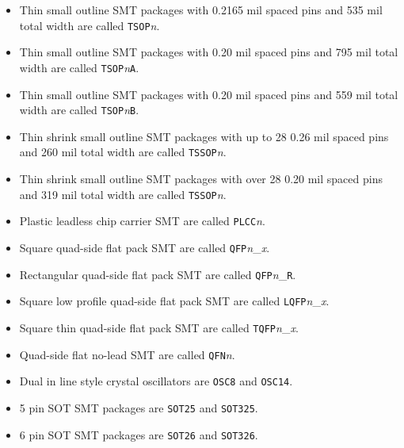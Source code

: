 \documentclass{article}
\begin{document}
\begin{itemize}
\item   Thin small outline SMT packages with 0.2165 mil spaced pins and
	535 mil total width are called {\tt TSOP}{\it n}.

\item   Thin small outline SMT packages with 0.20 mil spaced pins and
	795 mil total width are called {\tt TSOP}{\it n}{\tt A}.

\item   Thin small outline SMT packages with 0.20 mil spaced pins and
	559 mil total width are called {\tt TSOP}{\it n}{\tt B}.

\item   Thin shrink small outline SMT packages with up to 28 0.26 mil
	spaced pins and 260 mil total width are called {\tt TSSOP}{\it n}.

\item   Thin shrink small outline SMT packages with over 28 0.20 mil
	spaced pins and 319 mil total width are called {\tt TSSOP}{\it n}.

\item   Plastic leadless chip carrier SMT are called {\tt PLCC}{\it n}.

\item   Square quad-side flat pack SMT are called 
        {\tt QFP}{\it n}\_{\it x}.

\item   Rectangular quad-side flat pack SMT are called 
        {\tt QFP}{\it n}\_{\tt R}.

\item   Square low profile quad-side flat pack SMT are called 
        {\tt LQFP}{\it n}\_{\it x}.

\item   Square thin quad-side flat pack SMT are called 
        {\tt TQFP}{\it n}\_{\it x}.

\item   Quad-side flat no-lead SMT are called {\tt QFN}{\it n}.

\item   Dual in line style crystal oscillators are {\tt OSC8} and
	{\tt OSC14}.

\item   5 pin SOT SMT packages are {\tt SOT25} and {\tt SOT325}.

\item   6 pin SOT SMT packages are {\tt SOT26} and {\tt SOT326}.
\end{itemize}
\end{document}
